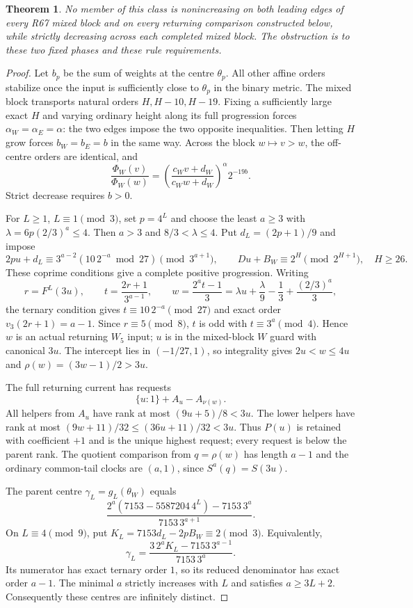 \documentclass[11pt]{article}
\newtheorem{theorem}{Theorem}
\begin{document}
\begin{theorem}\label{thm:finitecentres}
No member of this class is nonincreasing on both leading edges of every
R67 mixed block and on every returning comparison constructed below,
while strictly decreasing across each completed mixed block.
The obstruction is to these two fixed phases and these rule requirements.
\end{theorem}
\begin{proof}
Let $b_p$ be the sum of weights at the centre $\theta_p$.
All other affine orders stabilize once the input is sufficiently close
to $\theta_p$ in the binary metric. The mixed block transports natural
orders $H,H-10,H-19$. Fixing a sufficiently large exact $H$ and varying
ordinary height along its full progression forces
$\alpha_W=\alpha_E=\alpha$: the two edges impose the two opposite
inequalities. Then letting $H$ grow forces $b_W=b_E=b$ in the same way.
Across the block $w\mapsto v>w$, the off-centre orders are identical, and
\[
 \frac{\Phi_W(v)}{\Phi_W(w)}
 =\left(\frac{c_Wv+d_W}{c_Ww+d_W}\right)^\alpha2^{-19b}.
\]
Strict decrease requires $b>0$.

For $L\ge1$, $L\equiv1\pmod3$, set $p=4^L$ and choose the least $a\ge3$
with $\lambda=6p(2/3)^a\le4$. Then $a>3$ and $8/3<\lambda\le4$.
Put $d_L=(2p+1)/9$ and impose
\[
 2pu+d_L\equiv3^{a-2}(10\,2^{-a}\bmod27)\pmod{3^{a+1}},
 \qquad Du+B_W\equiv2^H\pmod{2^{H+1}},\quad H\ge26.
\]
These coprime conditions give a complete positive progression.
Writing
\[
 r=F^L(3u),\qquad t=\frac{2r+1}{3^{a-1}},\qquad
 w=\frac{2^at-1}{3}
   =\lambda u+\frac{\lambda}{9}-\frac13+\frac{(2/3)^a}{3},
\]
the ternary condition gives $t\equiv10\,2^{-a}\pmod{27}$ and exact
order $v_3(2r+1)=a-1$. Since $r\equiv5\pmod8$, $t$ is odd with
$t\equiv3^a\pmod4$. Hence $w$ is an actual returning $W_5$ input;
$u$ is in the mixed-block $W$ guard with canonical $3u$.
The intercept lies in $(-1/27,1)$, so integrality gives
$2u<w\le4u$ and $\rho(w)=(3w-1)/2>3u$.

The full returning current has requests
\[
 \{u:1\}+A_u-A_{\nu(w)}.
\]
All helpers from $A_u$ have rank at most $(9u+5)/8<3u$.
The lower helpers have rank at most
$(9w+11)/32\le(36u+11)/32<3u$.
Thus $P(u)$ is retained with coefficient $+1$ and is the unique highest
request; every request is below the parent rank.
The quotient comparison from $q=\rho(w)$ has length $a-1$ and the
ordinary common-tail clocks are $(a,1)$, since
$S^a(q)=S(3u)$.

The parent centre $\gamma_L=g_L(\theta_W)$ equals
\[
 \frac{2^a(7153-5587204\,4^L)-7153\,3^a}{7153\,3^{a+1}}.
\]
On $L\equiv4\pmod9$, put $K_L=7153d_L-2pB_W\equiv2\pmod3$.
Equivalently,
\[
 \gamma_L=\frac{3\,2^aK_L-7153\,3^{a-1}}{7153\,3^a}.
\]
Its numerator has exact ternary order $1$, so its reduced denominator
has exact order $a-1$. The minimal $a$ strictly increases with $L$
and satisfies $a\ge3L+2$. Consequently these centres are infinitely distinct.


\end{proof}
\end{document}
